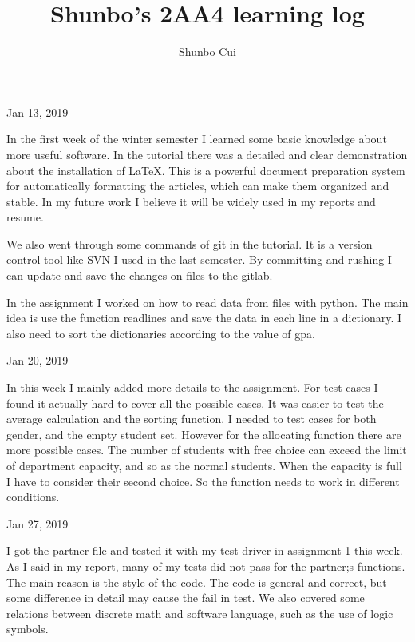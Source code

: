 \documentclass{article}
\title{Shunbo's 2AA4 learning log}
\author{Shunbo Cui}
\date{}
\begin{document}
\maketitle

\begin{flushleft}
Jan 13, 2019
\end{flushleft}
\par
In the first week of the winter semester I learned some basic knowledge about more useful software. In the tutorial there was a detailed and clear demonstration about the installation of LaTeX. This is a powerful document preparation system for automatically formatting the articles, which can make them organized and stable. In my future work I believe it will be widely used in my reports and resume.  \par
We also went through some commands of git in the tutorial. It is a version control tool like SVN I used in the last semester. By committing and rushing I can update and save the changes on files to the gitlab.\par
In the assignment I worked on how to read data from files with python. The main idea is use the function readlines and save the data in each line in a dictionary. I also need to sort the dictionaries according to the value of gpa.

\begin{flushleft}
Jan 20, 2019
\end{flushleft}
\par
In this week I mainly added more details to the assignment. For test cases I found it actually hard to cover all the possible cases. It was easier to test the average calculation and the sorting function. I needed to test cases for both gender, and the empty student set. However for the allocating function there are more possible cases. The number of students with free choice can exceed the limit of department capacity, and so as the normal students. When the capacity is full I have to consider their second choice. So the function needs to work in different conditions.\par

\begin{flushleft}
Jan 27, 2019
\end{flushleft}
\par
I got the partner file and tested it with my test driver in assignment 1 this week. As I said in my report, many of my tests did not pass for the partner;s functions. The main reason is the style of the code. The code is general and correct, but some difference in detail may cause the fail in test. We also covered some relations between discrete math and software language, such as the use of logic symbols.\par
\end{document}
